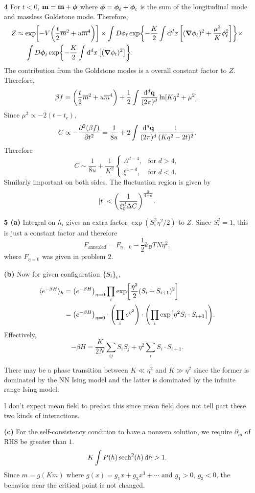 \documentclass{article}
\makeatletter
\newcommand*{\shifttext}[1]{%
  \settowidth{\@tempdima}{#1}%
  \hspace{-\@tempdima}#1%
}
\newcommand{\plabel}[1]{%
\shifttext{\textbf{#1}\quad}%
}
\newcommand{\prule}{%
\begin{center}%
\hdashrule[0.5ex]{.99\linewidth}{1pt}{1pt 2.5pt}%
\end{center}%
}
\makeatother
\begin{document}
\prule

\plabel{4}%
For $t<0$, $\vb{m} = \overline{\vb{m}} + \vb*{\phi}$ where $\vb*{\phi} = \vb*{\phi}_\ell + \vb*{\phi}_t$ is the sum of the longitudinal mode and massless Goldstone mode.
Therefore,
\begin{align*}
    Z &\approx \exp[-V\qty(\frac{t}{2}\overline{m}^2 + u\overline{m}^4)] \times \int D\phi_\ell \exp{-\frac{K}{2} \int \dd[d]{x}\qty[(\grad \phi_\ell)^2 + \frac{\mu^2}{K} \phi_\ell^2]} \times \\
    &\phantom{{}\approx{}} \int D\vb*{\phi}_t \exp{-\frac{K}{2} \int \dd[d]{x}\qty[(\grad \phi_t)^2]}.
\end{align*}
The contribution from the Goldstone modes is a overall constant factor to $Z$.
Therefore,
\[ \beta f = \qty(\frac{t}{2}\overline{m}^2 + u\overline{m}^4) + \frac{1}{2} \int \frac{\dd[d]{\vb{q}}}{(2\pi)^d} \ln[K q^2 + \mu^2]. \]
Since $\mu^2 \propto -2(t - t_c)$,
\[ C \propto -\pdv[2]{(\beta f)}{t} = \frac{1}{8u} + 2\int \frac{\dd[d]{\vb{q}}}{(2\pi)^d} \frac{1}{(Kq^2 - 2t)^2}. \]
Therefore
\[ C \sim \frac{1}{8u} + \frac{1}{K^2}\begin{cases}
    \Lambda^{d-4}, & \text{for } d>4,\\
    \xi^{4-d}, & \text{for } d<4.
\end{cases} \]
Similarly important on both sides.
The fluctuation region is given by
\[ \abs{t} < \qty(\frac{1}{\xi_0^d \Delta C})^{\frac{2}{4-d}}. \]

\prule

\plabel{5 (a)}%
Integral on $h_i$ gives an extra factor $\exp(S_i^2 \eta^2/2)$ to $Z$.
Since $S_i^2 = 1$, this is just a constant factor and therefore
\[ F_{\text{annealed}} = F_{\eta = 0} - \frac{1}{2} k_B T N \eta^2, \]
where $F_{\eta = 0}$ was given in problem 2.

\plabel{(b)}%
Now for given configuration $\qty{S_i}_i$,
\begin{align*}
    \langle e^{-\beta H} \rangle_h &= \qty(e^{-\beta H})_{\eta=0} \prod_{i} \exp[\frac{\eta^2}{2}(S_i + S_{i+1})^2] \\
    &= \qty(e^{-\beta H})_{\eta=0} \cdot \qty(\prod_i e^{\eta^2}) \cdot \qty(\prod_i \exp[\eta^2 S_i \cdot S_{i+1}]).
\end{align*}
Effectively,
\[ -\beta H = \frac{K}{2N} \sum_{ij} S_i S_j + \eta^2 \sum_i S_i \cdot S_{i+1}. \]
\par
There may be a phase transition between $K \ll \eta^2$ and $K \gg \eta^2$ since the former is dominated by the NN Ising model and the latter is dominated by the infinite range Ising model.
\par
I don't expect mean field to predict this since mean field does not tell part these two kinds of interactions.

\plabel{(c)}%
For the self-consistency condition to have a nonzero solution, we require $\partial_m$ of RHS be greater than $1$.
\[ K \int P(h) \sech^2(h) \dd{h} > 1. \]
Since $m = g(K m)$ where $g(x) = g_1 x + g_3 x^3 + \cdots$ and $g_1 > 0$, $g_3 < 0$, the behavior near the critical point is not changed.

% 
% 
\end{document}
